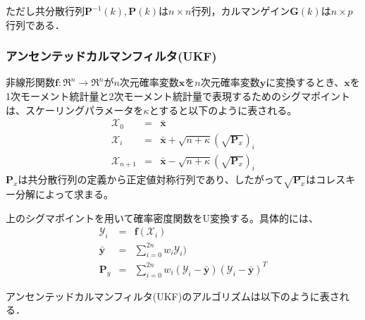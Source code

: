 \documentclass[twocolumn,oneside,a4paper]{article}
\begin{document}
ただし共分散行列$\bm{P}^{-1}(k), \bm{P}(k)$は$n \times n$行列，カルマンゲイン$\bm{G}(k)$は$n \times p$行列である．



\subsubsection{アンセンテッドカルマンフィルタ(UKF)}
非線形関数$\bm{f}: \mathfrak{R}^n \rightarrow \mathfrak{R}^n$が$n$次元確率変数$\bm{x}$を$n$次元確率変数$\bm{y}$に変換するとき、$\bm{x}$を1次モーメント統計量と2次モーメント統計量で表現するためのシグマポイントは、スケーリングパラメータを$\kappa$とすると以下のように表される。
\begin{eqnarray*}
	\mathscr{X}_0 &=& \bar{\bm{x}} \\
	\mathscr{X}_i &=& \bar{\bm{x}} + \sqrt{n+\kappa}(\sqrt{\bm{P}_x})_i\\
	\mathscr{X}_{n+1} &=& \bar{\bm{x}} - \sqrt{n+\kappa}(\sqrt{\bm{P}_x})_i
\end{eqnarray*}
$\bm{P}_x$は共分散行列の定義から正定値対称行列であり、したがって$\sqrt{\bm{P}_x}$はコレスキー分解によって求まる。

上のシグマポイントを用いて確率密度関数をU変換する。具体的には、
\begin{eqnarray*}
	\mathscr{Y}_i &=& \bm{f}(\mathscr{X}_i) \\
	\bar{\bm{y}} &=& \sum_{i=0}^{2n} w_i \mathscr{Y}_i) \\
	\bm{P}_y &=& \sum_{i=0}^{2n} w_i (\mathscr{Y}_i - \bar{\bm{y}}) (\mathscr{Y}_i - \bar{\bm{y}})^{T}
\end{eqnarray*}


アンセンテッドカルマンフィルタ(UKF)のアルゴリズムは以下のように表される．
\end{document}
